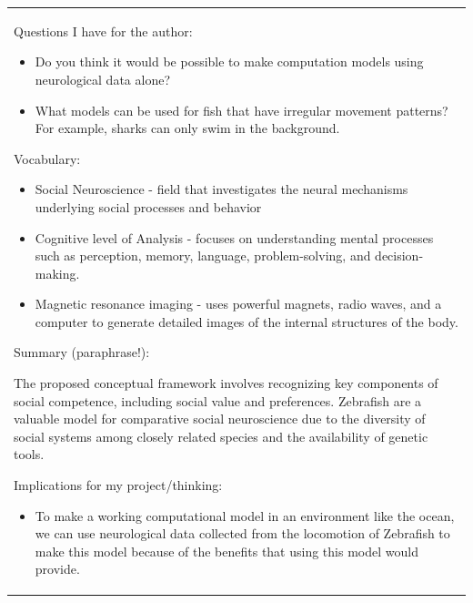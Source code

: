 \begin{longtable}[]{@{}
  >{\raggedright\arraybackslash}p{}@{}}
Questions I have for the author:

\begin{itemize}
\item
  Do you think it would be possible to make computation models using
  neurological data alone?
\item
  What models can be used for fish that have irregular movement
  patterns? For example, sharks can only swim in the background.
\end{itemize}


Vocabulary:

\begin{itemize}
\item
  Social Neuroscience - field that investigates the neural mechanisms
  underlying social processes and behavior
\item
  Cognitive level of Analysis - focuses on understanding mental
  processes such as perception, memory, language, problem-solving, and
  decision-making.
\item
  Magnetic resonance imaging - uses powerful magnets, radio waves, and a
  computer to generate detailed images of the internal structures of the
  body.
\end{itemize}


Summary (paraphrase!):

The proposed conceptual framework involves recognizing key components of
social competence, including social value and preferences. Zebrafish are
a valuable model for comparative social neuroscience due to the
diversity of social systems among closely related species and the
availability of genetic tools.


Implications for my project/thinking:

\begin{itemize}
\item
  To make a working computational model in an environment like the
  ocean, we can use neurological data collected from the locomotion of
  Zebrafish to make this model because of the benefits that using this
  model would provide.
\end{itemize}

\midrule\noalign{}
\endhead
\bottomrule\noalign{}
\endlastfoot
\end{longtable}

\subsection{}\label{section}


